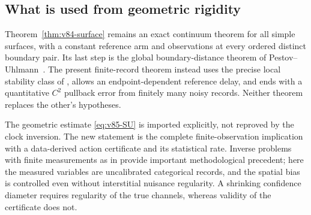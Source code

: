 \subsection{What is used from geometric rigidity}
Theorem~\ref{thm:v84-surface} remains an exact continuum theorem for
all simple surfaces, with a constant reference arm and observations at
every ordered distinct boundary pair. Its last step is the global
boundary-distance theorem of Pestov--Uhlmann~\cite{V84PU}. The present
finite-record theorem instead uses the precise local stability class
of \cite{V85SU}, allows an endpoint-dependent reference delay, and
ends with a quantitative $C^2$ pullback error from finitely many noisy
records. Neither theorem replaces the other's hypotheses.

The geometric estimate \eqref{eq:v85-SU} is imported explicitly, not
reproved by the clock inversion. The new statement is the complete
finite-observation implication with a data-derived action certificate
and its statistical rate. Inverse problems with finite measurements
as in \cite{V85AS} provide important methodological precedent; here
the measured variables are uncalibrated categorical records, and the
spatial bias is controlled even without interstitial nuisance
regularity. A shrinking confidence diameter requires regularity of the
true channels, whereas validity of the certificate does not.
